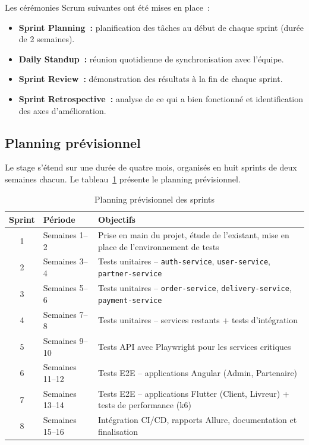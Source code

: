 Les cérémonies Scrum suivantes ont été mises en place~:

\begin{itemize}
    \item \textbf{Sprint Planning~:} planification des tâches au début de chaque sprint (durée de 2 semaines).
    \item \textbf{Daily Standup~:} réunion quotidienne de synchronisation avec l'équipe.
    \item \textbf{Sprint Review~:} démonstration des résultats à la fin de chaque sprint.
    \item \textbf{Sprint Retrospective~:} analyse de ce qui a bien fonctionné et identification des axes d'amélioration.
\end{itemize}

\subsection{Planning prévisionnel}
\label{subsec:planning-previsionnel}

Le stage s'étend sur une durée de quatre mois, organisés en huit sprints de deux semaines chacun. Le tableau~\ref{tab:planning-sprints} présente le planning prévisionnel.

\begin{table}[H]
\centering
\caption{Planning prévisionnel des sprints}
\label{tab:planning-sprints}
\begin{tabular}{|c|l|p{7cm}|}
\hline
\rowcolor{gray!20}
\textbf{Sprint} & \textbf{Période} & \textbf{Objectifs} \\
\hline
1 & Semaines 1--2 & Prise en main du projet, étude de l'existant, mise en place de l'environnement de tests \\
\hline
2 & Semaines 3--4 & Tests unitaires -- \texttt{auth-service}, \texttt{user-service}, \texttt{partner-service} \\
\hline
3 & Semaines 5--6 & Tests unitaires -- \texttt{order-service}, \texttt{delivery-service}, \texttt{payment-service} \\
\hline
4 & Semaines 7--8 & Tests unitaires -- services restants + tests d'intégration \\
\hline
5 & Semaines 9--10 & Tests API avec Playwright pour les services critiques \\
\hline
6 & Semaines 11--12 & Tests E2E -- applications Angular (Admin, Partenaire) \\
\hline
7 & Semaines 13--14 & Tests E2E -- applications Flutter (Client, Livreur) + tests de performance (k6) \\
\hline
8 & Semaines 15--16 & Intégration CI/CD, rapports Allure, documentation et finalisation \\
\hline
\end{tabular}
\end{table}

